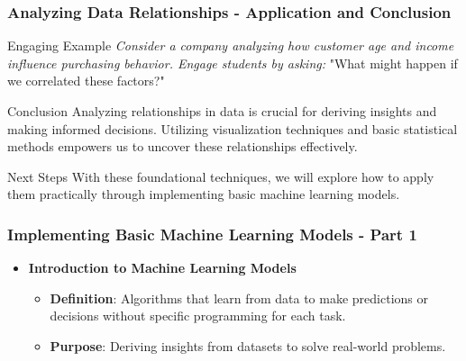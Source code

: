 \documentclass[aspectratio=169]{beamer}
\begin{document}
\begin{frame}[fragile]
    \frametitle{Analyzing Data Relationships - Application and Conclusion}
    \begin{block}{Engaging Example}
        \textit{Consider a company analyzing how customer age and income influence purchasing behavior. Engage students by asking:}
        "What might happen if we correlated these factors?"
    \end{block}

    \begin{block}{Conclusion}
        Analyzing relationships in data is crucial for deriving insights and making informed decisions. Utilizing visualization techniques and basic statistical methods empowers us to uncover these relationships effectively.
    \end{block}
    
    \begin{block}{Next Steps}
        With these foundational techniques, we will explore how to apply them practically through implementing basic machine learning models.
    \end{block}
\end{frame}

\begin{frame}[fragile]
    \frametitle{Implementing Basic Machine Learning Models - Part 1}
    \begin{itemize}
        \item \textbf{Introduction to Machine Learning Models}
            \begin{itemize}
                \item \textbf{Definition}: Algorithms that learn from data to make predictions or decisions without specific programming for each task.
                \item \textbf{Purpose}: Deriving insights from datasets to solve real-world problems.
            \end{itemize}
    \end{itemize}
\end{frame}
\end{document}
